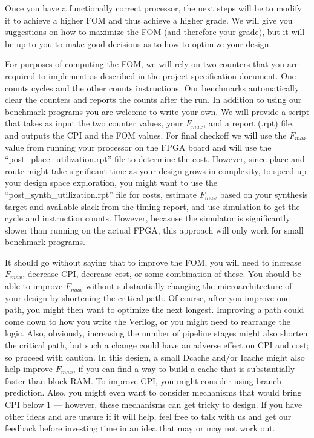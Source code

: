 Once you have a functionally correct processor, the next steps will be to modify it to achieve a higher FOM and thus achieve a higher grade.
We will give you suggestions on how to maximize the FOM (and therefore your grade),
but it will be up to you to make good decisions as to how to optimize your design.

For purposes of computing the FOM, we will rely on two counters that you are required to implement as described in the project specification document.
One counts cycles and the other counts instructions.
Our benchmarks automatically clear the counters and reports the counts after the run.  In addition to using our benchmark programs you are welcome to write your own.
We will provide a script that takes as input the two counter values, your $F_{max}$, and a report (.rpt) file, and outputs the CPI and the FOM values.
For final checkoff we will use the $F_{max}$ value from running your processor on the FPGA board and will use the ``post\_place\_utilization.rpt'' file to determine the cost.
However, since place and route might take significant time as your design grows in complexity, to speed up your design space exploration, you might want
to use the ``post\_synth\_utilization.rpt'' file for costs, estimate $F_{max}$ based on your synthesis target and available slack from the timing report, and use simulation to get the cycle and instruction counts.  However, becasuse the simulator is significantly slower than running on the actual FPGA, this approach will only work for small benchmark programs.


It should go without saying that to improve the FOM, you will need to increase $F_{max}$, decrease CPI, decrease cost, or some combination of these.
You should be able to improve $F_{max}$ without substantially changing the microarchitecture of your design
by shortening the critical path.
Of course, after you improve one path, you might then want to optimize the next longest.
Improving a path could come down to how you write the Verilog, or you might need to rearrange the logic.
Also, obviously, increasing the number of pipeline stages might also shorten the critical path, but such a change could have an adverse effect on CPI and cost; so proceed with caution.
In this design, a small Dcache and/or Icache might also help improve $F_{max}$, if you can find a way to build a cache that is substantially faster than block RAM.
To improve CPI, you might consider using branch prediction.
Also, you might even want to consider mechanisms that would bring CPI below 1 --- however, these mechanisms can get tricky to design.
If you have other ideas and are unsure if it will help, feel free to talk with us and get our feedback before investing time in an idea that may or may not work out.

